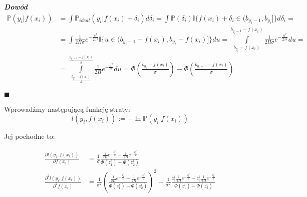 \documentclass[12pt,a4paper]{article}
\newenvironment{dow}{\textbf{\textit{Dowód}}}{\begin{flushright} $\blacksquare$ \end{flushright}}
\begin{document}
\begin{dow}
\begin{align*}
\mathbb{P} (y_i|f(x_i)) 
&= \int \mathbb{P}_{ideal} (y_i |f(x_i)+\delta_i)d\delta_i = \int \mathbb{P}(\delta_i) \mathbb{I}\lbrace f(x_i)+\delta_i\in (b_{y_i-1}, b_{y_i}] \rbrace d\delta_i =\\
&= \int \frac{1}{2\Pi\sigma}e^{-\frac{u^2}{2\sigma^2}} \mathbb{I}\lbrace u\in (b_{y_i-1}-f(x_i), b_{y_i}-f(x_i)] \rbrace du = \int \limits_{b_{y_i}-f(x_i)}^{b_{y_i-1}-f(x_i)}\frac{1}{2\Pi\sigma}e^{-\frac{u^2}{2\sigma^2}} du =\\
&=  \int \limits_{\frac{b_{y_i}-f(x_i)}{\delta}}^{\frac{b_{y_i-1}-f(x_i)}{\delta}}\frac{1}{2\Pi}e^{-\frac{u^2}{2}} du = \Phi\left( \frac{b_{y_i}-f(x_i)}{\sigma} \right) - \Phi\left( \frac{b_{y_i-1}-f(x_i)}{\sigma} \right)
\end{align*}

\end{dow}

Wprowadźmy następującą funkcję straty:
$$
\textit{l}(y_i, f(x_i)) := -\ln\mathbb{P}(y_i| f(x_i))
$$

Jej pochodne to:

\begin{align*}
\frac{\partial\textit{l}(y_i, f(x_i))}{\partial f(x_i)} 
&= \frac{1}{\sigma}\frac{\frac{1}{2\Pi}e^{-\frac{z_1^{i^2}}{2}}-\frac{1}{2\Pi}e^{-\frac{z_2^{i^2}}{2}}}{\Phi\left( z_1^i \right) - \Phi\left( z_2^i \right)}\\
\frac{\partial^2\textit{l}(y_i, f(x_i))}{\partial^2 f(x_i)} 
&= \frac{1}{\sigma^2}\left( \frac{\frac{1}{2\Pi}e^{-\frac{z_1^{i^2}}{2}}-\frac{1}{2\Pi}e^{-\frac{z_2^{i^2}}{2}}}{\Phi\left( z_1^i \right) - \Phi\left( z_2^i \right)} \right)^2 + \frac{1}{\sigma^2}\frac{z_1^i\frac{1}{2\Pi}e^{-\frac{z_1^{i^2}}{2}}-z_2^i\frac{1}{2\Pi}e^{-\frac{z_2^{i^2}}{2}}}{\Phi\left( z_1^i \right) - \Phi\left( z_2^i \right)}
\end{align*}
\end{document}
